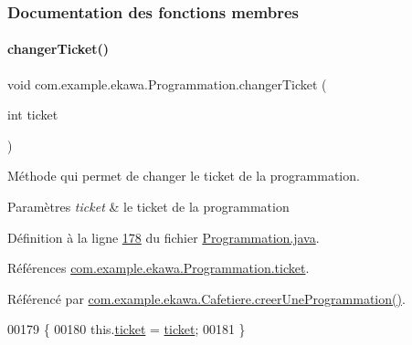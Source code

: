 \subsubsection{Documentation des fonctions membres}
\mbox{\label{classcom_1_1example_1_1ekawa_1_1_programmation_afb82bed29c60248fe8d966af8d6da897}} 
\paragraph{\texorpdfstring{changer\+Ticket()}{changerTicket()}}
{\footnotesize\ttfamily void com.\+example.\+ekawa.\+Programmation.\+changer\+Ticket (\begin{DoxyParamCaption}\item[{int}]{ticket }\end{DoxyParamCaption})}



Méthode qui permet de changer le ticket de la programmation. 


\begin{DoxyParams}{Paramètres}
{\em ticket} & le ticket de la programmation \\
\hline
\end{DoxyParams}


Définition à la ligne \hyperlink{_programmation_8java_source_l00178}{178} du fichier \hyperlink{_programmation_8java_source}{Programmation.\+java}.



Références \hyperlink{_programmation_8java_source_l00081}{com.\+example.\+ekawa.\+Programmation.\+ticket}.



Référencé par \hyperlink{_cafetiere_8java_source_l00731}{com.\+example.\+ekawa.\+Cafetiere.\+creer\+Une\+Programmation()}.


\begin{DoxyCode}
00179     \{
00180         this.\hyperlink{classcom_1_1example_1_1ekawa_1_1_programmation_a54ce49550025f7f5e5080f0548b08653}{ticket} = \hyperlink{classcom_1_1example_1_1ekawa_1_1_programmation_a54ce49550025f7f5e5080f0548b08653}{ticket};
00181     \}
\end{DoxyCode}
\mbox{\label{classcom_1_1example_1_1ekawa_1_1_programmation_a325b9fb3bb7e041e783ecc0ed8234c20}} 
